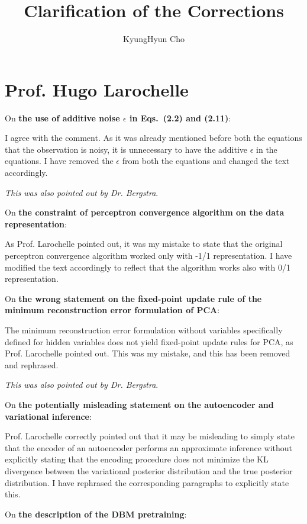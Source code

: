 \documentclass[11pt, oneside]{essay}
\title{Clarification of the Corrections}
\author{KyungHyun Cho}
\begin{document}
\thispagestyle{empty}


\maketitle

\section{Prof. Hugo Larochelle}

On \textbf{the use of additive noise $\epsilon$ in
Eqs.~(2.2) and (2.11)}:

I agree with the comment. As it was already mentioned before
both the equations that the observation is noisy, it is
unnecessary to have the additive $\epsilon$ in the
equations. I have removed the $\epsilon$ from both the
equations and changed the text accordingly.

\textit{This was also pointed out by Dr. Bergstra}.

On \textbf{the constraint of perceptron convergence
algorithm on the data representation}:

As Prof. Larochelle pointed out, it was my mistake to
state that the original perceptron convergence algorithm
worked only with -1/1 representation. I have modified the
text accordingly to reflect that the algorithm works also
with 0/1 representation.

On \textbf{the wrong statement on the fixed-point update
rule of the minimum reconstruction error formulation of
PCA}:

The minimum reconstruction error formulation without
variables specifically defined for hidden variables does not
yield fixed-point update rules for PCA, as Prof. Larochelle
pointed out. This was my mistake, and this has been removed
and rephrased.

\textit{This was also pointed out by Dr. Bergstra}.

On \textbf{the potentially misleading statement on the
autoencoder and variational inference}:

Prof. Larochelle correctly pointed out that it may be
misleading to simply state that the encoder of an
autoencoder performs an approximate inference without
explicitly stating that the encoding procedure does not
minimize the KL divergence between the variational posterior
distribution and the true posterior distribution. I have
rephrased the corresponding paragraphs to explicitly state
this.

On \textbf{the description of the DBM pretraining}:
\end{document}
